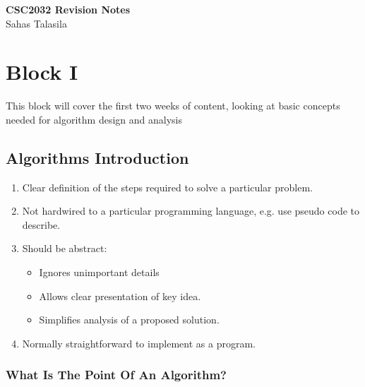 \documentclass[a4paper,12pt]{article}
\date{} %
\begin{document}
\onehalfspacing
\begin{titlepage}
    \centering
    \vspace*{2cm}
    \Huge{\textbf{CSC2032 Revision Notes}} \\[1.5cm]
    \Large{Sahas Talasila} \\[1cm]
    \vfill
\end{titlepage}

\begingroup
  \setlength{\parskip}{0pt}%
  \tableofcontents
\endgroup

\newpage

\pagestyle{empty}

\section{Block I}

This block will cover the first two weeks of content, looking at basic concepts needed for algorithm design and analysis

\subsection{Algorithms Introduction}

\begin{enumerate}
    \item Clear definition of the steps required to solve a particular
    problem.
    \item Not hardwired to a particular programming language, e.g.
    use pseudo code to describe.
    \item Should be abstract:
    \begin{itemize}
        \item Ignores unimportant details
        \item Allows clear presentation of key idea.
        \item Simplifies analysis of a proposed solution.
    \end{itemize}
    \item Normally straightforward to implement as a program.
\end{enumerate}

\subsubsection{What Is The Point Of An Algorithm?}
\end{document}
